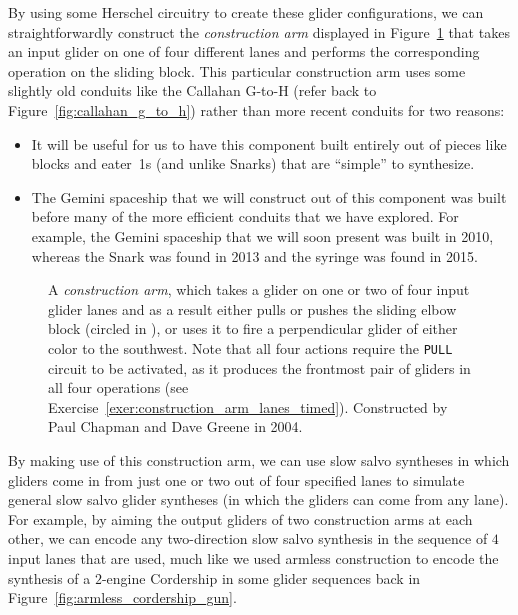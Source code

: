 By using some Herschel circuitry to create these glider configurations, we can straightforwardly construct the \emph{construction arm} displayed in Figure~\ref{fig:construction_arm} that takes an input glider on one of four different lanes and performs the corresponding operation on the sliding block. This particular construction arm uses some slightly old conduits like the Callahan G-to-H (refer back to Figure~\ref{fig:callahan_g_to_h}) rather than more recent conduits for two reasons:\smallskip

\begin{itemize}
	\item It will be useful for us to have this component built entirely out of pieces like blocks and eater~1s (and unlike Snarks) that are ``simple'' to synthesize.\smallskip
	
	\item The Gemini spaceship that we will construct out of this component was built before many of the more efficient conduits that we have explored. For example, the Gemini spaceship that we will soon present was built in 2010, whereas the Snark was found in 2013 and the syringe was found in 2015.\smallskip
\end{itemize}

\begin{figure}[!htb]
	\centering
	\caption{A \emph{construction arm}, which takes a glider on one or two of four input glider lanes and as a result either pulls or pushes the sliding elbow block (circled in ), or uses it to fire a perpendicular glider of either color to the southwest. Note that all four actions require the \texttt{PULL} circuit to be activated, as it produces the frontmost pair of gliders in all four operations (see Exercise~\ref{exer:construction_arm_lanes_timed}). Constructed by Paul Chapman and Dave Greene in 2004.}\label{fig:construction_arm}
\end{figure}

By making use of this construction arm, we can use slow salvo syntheses in which gliders come in from just one or two out of four specified lanes to simulate general slow salvo glider syntheses (in which the gliders can come from any lane). For example, by aiming the output gliders of two construction arms at each other, we can encode any two-direction slow salvo synthesis in the sequence of $4$ input lanes that are used, much like we used armless construction to encode the synthesis of a $2$-engine Cordership in some glider sequences back in Figure~\ref{fig:armless_cordership_gun}.


